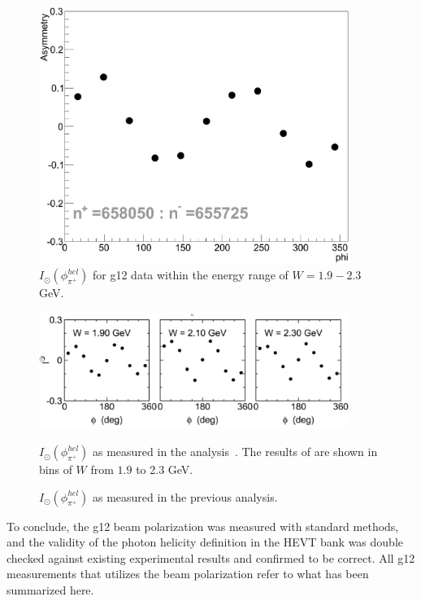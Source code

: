 \begin{figure}[h]
\begin{center}
 \includegraphics[width=0.9\textwidth]{figures/calib/pol/myIo.eps}
  \caption{$I_{\odot}(\phi^{hel}_{\pi^+})$ for g12 data within the energy range of $W = 1.9-2.3$ GeV.}
  \label{myIo}
  \end{center}
\end{figure}


\begin{figure}[h]
\begin{center}
 \includegraphics[width=0.9\textwidth]{figures/calib/pol/Io.eps}
  \caption{$I_{\odot}(\phi^{hel}_{\pi^+})$ as measured in the previous analysis.}{ $I_{\odot}(\phi^{hel}_{\pi^+})$ as measured in the analysis~\cite{Io}. The results of are shown in bins of $W$ from $1.9$ to 2.3 GeV.}
  \label{Io}
  \end{center}
\end{figure}




To conclude, the g12 beam polarization was measured with standard methods, and the validity of the photon helicity definition in the HEVT bank was double checked against existing experimental results and confirmed to be correct. All g12 measurements that utilizes the beam polarization refer to what has been summarized here.


